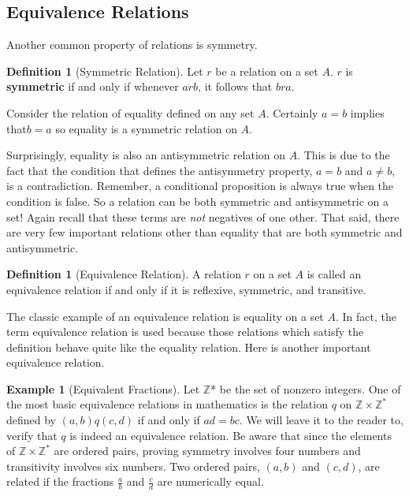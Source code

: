 \documentclass[10pt,]{book}
\newcommand{\terminology}[1]{\textbf{#1}}
\theoremstyle{plain}
\theoremstyle{definition}
\newtheorem{definition}[theorem]{Definition}
\theoremstyle{definition}
\theoremstyle{definition}
\newtheorem{example}[theorem]{Example}
\theoremstyle{definition}
\begin{document}
\subsection[Equivalence Relations]{Equivalence Relations}\label{ss-equivalence-relations}
Another common property of relations is symmetry.%
\begin{definition}[Symmetric Relation]\label{def-symmetric-relation}
Let \(r\) be a relation on a set \(A\). \(r\) is \terminology{symmetric} if and only if whenever \(a r b\), it follows that \(b r a\).%
\end{definition}
\par
Consider the relation of equality defined on any set \(A\). Certainly \(a = b\) implies that\(b = a\) so equality is a symmetric relation on \(A\).%
\par
Surprisingly, equality is also an antisymmetric relation on \(A\). This is due to the fact that the condition that defines the antisymmetry property, \(a = b\) and \(a \neq  b\), is a contradiction. Remember, a conditional proposition is always true when the condition is false. So a relation can be both symmetric and antisymmetric on a set! Again recall that these terms are \emph{not} negatives of one other. That said, there are very few important relations other than equality that are both symmetric and antisymmetric.%
\begin{definition}[Equivalence Relation]\label{def-equivalence-relation}
A relation \(r\) on a set \(A\) is called an equivalence relation if and only if it is reflexive, symmetric, and transitive.%
\end{definition}
\par
The classic example of an equivalence relation is equality on a set \(A\). In fact, the term equivalence relation is used because those relations which satisfy the definition behave quite like the equality relation. Here is another important equivalence relation.%
\begin{example}[Equivalent Fractions]\label{ex-fraction-equivalence}
Let \(\mathbb{Z}\)* be the set of nonzero integers. One of the most basic equivalence relations in mathematics is the relation \(q\) on \(\mathbb{Z}\times \mathbb{Z}^*\) defined by \((a, b) q(c, d)\) if and only if \(a d = b c\). We will leave it to the reader to, verify
that \(q\) is indeed an equivalence relation. Be aware that since the elements of \(\mathbb{Z}\times \mathbb{Z}^*\) are ordered pairs, proving symmetry involves four numbers and transitivity involves six numbers. Two ordered pairs, \((a, b)\) and \((c, d)\), are related if the fractions \(\frac{a}{b}\) and \(\frac{c}{d}\) are numerically equal.
%
\end{example}
\end{document}
